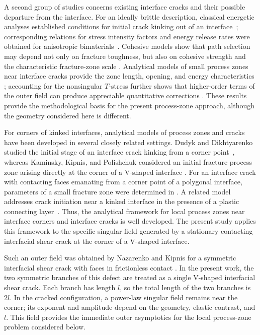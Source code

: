 A second group of studies concerns existing interface cracks and their
possible departure from the interface. For an ideally brittle description,
classical energetic analyses established conditions for initial crack kinking
out of an interface~\cite{HeHutchinson1989}; corresponding relations for
stress intensity factors and energy release rates were obtained for
anisotropic bimaterials~\cite{Wang1994}. Cohesive models show that path
selection may depend not only on fracture toughness, but also on cohesive
strength and the characteristic fracture-zone scale
\cite{ParmigianiThouless2006}. Analytical models of small process zones near
interface cracks provide the zone length, opening, and energy characteristics
\cite{KaminskyEtAl2023}; accounting for the
nonsingular $T$-stress further shows that higher-order terms of the outer
field can produce appreciable quantitative corrections
\cite{KaminskyDudykChornoivan2026}. These results provide the methodological basis for the present process-zone
approach, although the geometry considered here is different.

For corners of kinked interfaces, analytical models of process zones and
cracks have been developed in several closely related settings.
Dudyk and Dikhtyarenko studied the initial stage of an interface crack
kinking from a corner point~\cite{DudykDikhtyarenko2012}, whereas Kaminsky,
Kipnis, and Polishchuk considered an initial fracture process zone arising
directly at the corner of a V-shaped interface
\cite{KaminskyKipnisPolishchuk2012}. For an interface crack with contacting
faces emanating from a corner point of a polygonal interface, parameters of a
small fracture zone were determined in
\cite{KaminskyDudykFenkiv2023}. A related model addresses crack initiation near a kinked interface in the
presence of a plastic connecting layer~\cite{KaminskyDudykPolishchuk2024}. Thus, the analytical framework for local process zones near interface
corners and interface cracks is well developed. The present study applies
this framework to the specific singular field generated by a stationary
contacting interfacial shear crack at the corner of a V-shaped interface.

Such an outer field was obtained by Nazarenko and Kipnis for a symmetric
interfacial shear crack with faces in frictionless contact
\cite{NazarenkoKipnis2022Stress}. In the present work, the two symmetric
branches of this defect are treated as a single V-shaped interfacial shear
crack. Each branch has length $l$, so the total length of the two branches is
$2l$. In the cracked configuration, a power-law singular field remains near
the corner; its exponent and amplitude depend on the geometry, elastic
contrast, and $l$. This field provides the immediate outer asymptotics for
the local process-zone problem considered below.

